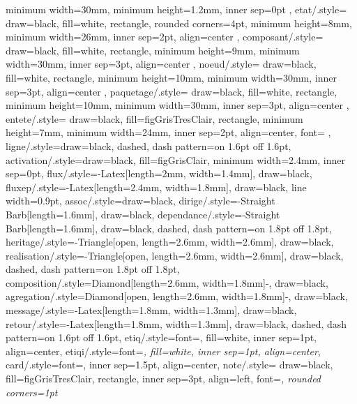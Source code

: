 {{    minimum width=30mm, minimum height=1.2mm, inner sep=0pt
  },
  etat/.style={
    draw=black, fill=white, rectangle, rounded corners=4pt,
    minimum height=8mm, minimum width=26mm,
    inner sep=2pt, align=center
  },
  composant/.style={
    draw=black, fill=white, rectangle,
    minimum height=9mm, minimum width=30mm,
    inner sep=3pt, align=center
  },
  noeud/.style={
    draw=black, fill=white, rectangle,
    minimum height=10mm, minimum width=30mm,
    inner sep=3pt, align=center
  },
  paquetage/.style={
    draw=black, fill=white, rectangle,
    minimum height=10mm, minimum width=30mm,
    inner sep=3pt, align=center
  },
  entete/.style={
    draw=black, fill=figGrisTresClair, rectangle,
    minimum height=7mm, minimum width=24mm,
    inner sep=2pt, align=center, font=\sffamily\scriptsize\bfseries
  },
  ligne/.style={draw=black, dashed, dash pattern=on 1.6pt off 1.6pt},
  activation/.style={draw=black, fill=figGrisClair, minimum width=2.4mm, inner sep=0pt},
  flux/.style={-{Latex[length=2mm, width=1.4mm]}, draw=black},
  fluxep/.style={-{Latex[length=2.4mm, width=1.8mm]}, draw=black, line width=0.9pt},
  assoc/.style={draw=black},
  dirige/.style={-{Straight Barb[length=1.6mm]}, draw=black},
  dependance/.style={-{Straight Barb[length=1.6mm]}, draw=black, dashed,
                     dash pattern=on 1.8pt off 1.8pt},
  heritage/.style={-{Triangle[open, length=2.6mm, width=2.6mm]}, draw=black},
  realisation/.style={-{Triangle[open, length=2.6mm, width=2.6mm]}, draw=black, dashed,
                      dash pattern=on 1.8pt off 1.8pt},
  composition/.style={{Diamond[length=2.6mm, width=1.8mm]}-, draw=black},
  agregation/.style={{Diamond[open, length=2.6mm, width=1.8mm]}-, draw=black},
  message/.style={-{Latex[length=1.8mm, width=1.3mm]}, draw=black},
  retour/.style={-{Latex[length=1.8mm, width=1.3mm]}, draw=black, dashed,
                 dash pattern=on 1.6pt off 1.6pt},
  etiq/.style={font=\sffamily\tiny, fill=white, inner sep=1pt, align=center},
  etiqi/.style={font=\sffamily\tiny\itshape, fill=white, inner sep=1pt, align=center},
  card/.style={font=\sffamily\tiny, inner sep=1.5pt, align=center},
  note/.style={
    draw=black, fill=figGrisTresClair, rectangle,
    inner sep=3pt, align=left, font=\sffamily\tiny\itshape,
    rounded corners=1pt
  }
}


